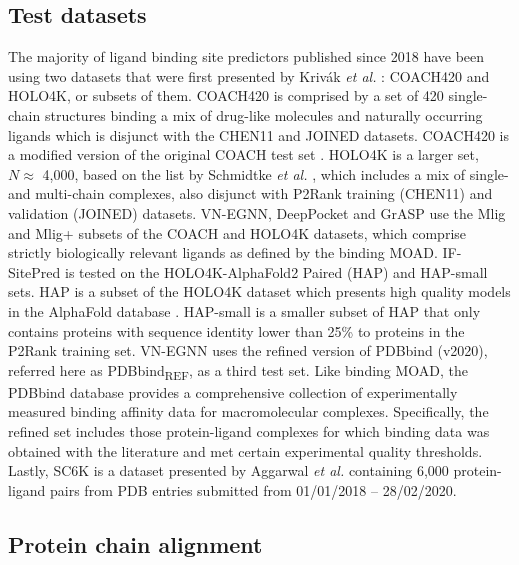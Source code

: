 \subsection{Test datasets}

The majority of ligand binding site predictors published since 2018 have been using two datasets that were first presented by Krivák \textit{et al.} \cite{KRIVAK_2018_P2RANK}: COACH420 and HOLO4K, or subsets of them. COACH420 is comprised by a set of 420 single-chain structures binding a mix of drug-like molecules and naturally occurring ligands which is disjunct with the CHEN11 and JOINED datasets. COACH420 is a modified version of the original COACH test set \cite{ROY_2012_COFACTOR, YANG_2013_COFACTOR}. HOLO4K is a larger set, $N \approx$ 4,000, based on the list by Schmidtke \textit{et al.} \cite{SCHMIDTKE_2010_FPOCKET}, which includes a mix of single- and multi-chain complexes, also disjunct with P2Rank training (CHEN11) and validation (JOINED) datasets. VN-EGNN, DeepPocket and GrASP use the Mlig and Mlig+ subsets of the COACH and HOLO4K datasets, which comprise strictly biologically relevant ligands as defined by the binding MOAD. IF-SitePred is tested on the HOLO4K-AlphaFold2 Paired (HAP) and HAP-small sets. HAP is a subset of the HOLO4K dataset which presents high quality models in the AlphaFold database \cite{VARADI_2022_ALPHAFOLDDB}. HAP-small is a smaller subset of HAP that only contains proteins with sequence identity lower than 25\% to proteins in the P2Rank training set. VN-EGNN uses the refined version of PDBbind (v2020), referred here as PDBbind\textsubscript{REF}, \cite{WANG_2004_PDBBIND, WANG_2005_PDBBIND, CHENG_2009_PDBBIND, LI_2014_PDBBIND, LIU_2015_PDBBIND, LIU_2017_PDBBIND} as a third test set. Like binding MOAD, the PDBbind database provides a comprehensive collection of experimentally measured binding affinity data for macromolecular complexes. Specifically, the refined set includes those protein-ligand complexes for which binding data was obtained with the literature and met certain experimental quality thresholds. Lastly, SC6K is a dataset presented by Aggarwal \textit{et al.} \cite{AGGARWAL_2022_DEEPPOCKET} containing 6,000 protein-ligand pairs from PDB entries submitted from 01/01/2018 – 28/02/2020.

\subsection{Protein chain alignment}

